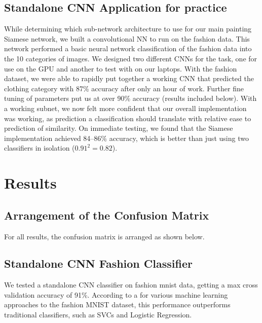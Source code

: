 \documentclass[a4paper, 11pt]{article}
\begin{document}
\subsection{Standalone CNN Application for practice} 

While determining which sub-network architecture to use for our main painting Siamese network, we built a convolutional NN to run on the fashion data. This network performed a basic neural network classification of the fashion data into the 10 categories of images. We designed two different CNNs for the task, one for use on the GPU and another to test with on our laptops. With the fashion dataset, we were able to rapidly put together a working CNN that predicted the clothing category with 87\% accuracy after only an hour of work. Further fine tuning of parameters put us at over 90\% accuracy (results included below). With a working subnet, we now felt more confident that our overall implementation was working, as prediction a classification should translate with relative ease to prediction of similarity. On immediate testing, we found that the Siamese implementation achieved 84--86\% accuracy, which is better than just using two classifiers in isolation ($0.91^2 = 0.82 $).

\section{Results}

\subsection{Arrangement of the Confusion Matrix}

For all results, the confusion matrix is arranged as shown below.


\subsection{Standalone CNN Fashion Classifier}

We tested a standalone CNN classifier on fashion mnist data, getting a max cross validation accuracy of 91\%. According to a for various machine learning approaches to the fashion MNIST dataset, this performance outperforms traditional classifiers, such as SVCs and Logistic Regression.
\end{document}
